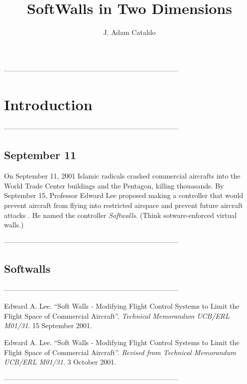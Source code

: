 \documentclass{report}
\begin{document}
\title{SoftWalls in Two Dimensions}
\author{J. Adam Cataldo}
\maketitle

---------------------------------------------------------------------------
\section{Introduction}

---------------------------------------------------------------------------
\subsection{September 11}

On September 11, 2001 Islamic radicals crashed commercial aircrafts
into the World Trade Center buildings and the Pentagon, killing
thouasands.  By September 15, Professor Edward Lee proposed making a
controller that would prevent aircraft from flying into restricted
airspace and prevent future aircraft attacks \cite{Lee1}.  He named
the controller \textit{Softwalls}.  (Think sotware-enforced virtual
walls.)

---------------------------------------------------------------------------
\subsection{Softwalls}

---------------------------------------------------------------------------
\begin{thebibliography}{1}

Edward A. Lee.  ``Soft Walls - Modifying Flight Control Systems to
Limit the Flight Space of Commercial Aircraft''.  \textit{Technical
Memorandum UCB/ERL M01/31}.  15 September 2001.

Edward A. Lee.  ``Soft Walls - Modifying Flight Control Systems to
Limit the Flight Space of Commercial Aircraft''.  \textit{Revised from
Technical Memorandum UCB/ERL M01/31}.  3 October 2001.

\end{thebibliography}

---------------------------------------------------------------------------
\end{document}
